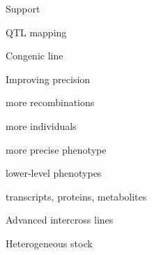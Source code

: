 \documentclass[aspectratio=169,12pt,t]{beamer}
\begin{document}
\begin{frame}{}

\vspace*{16.7mm}

\centerline{\Large Support}

\note{
}
\end{frame}



\begin{frame}[c]{QTL mapping}

\vspace{5mm}

\note{
}
\end{frame}



\begin{frame}[c]{Congenic line}


\note{
}
\end{frame}



\begin{frame}[c]{Improving precision}

  \vspace{-20mm}

  \bbi
\item more recombinations
\item more individuals
\item more precise phenotype
\item lower-level phenotypes
\bi
\item transcripts, proteins, metabolites
  \ei
  \ei

\note{
}
\end{frame}



\begin{frame}[c]{Advanced intercross lines}


\note{
}
\end{frame}




\begin{frame}[c]{Heterogeneous stock}

  \vspace{2mm}


\note{
}
\end{frame}
\end{document}
